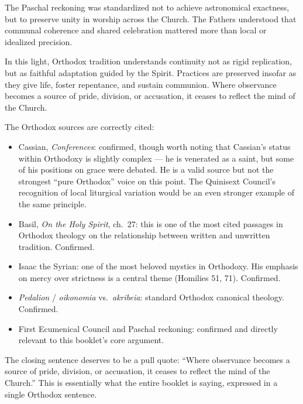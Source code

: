 \documentclass[10pt,twoside,openany]{book}
\begin{document}
The Paschal reckoning was standardized not to achieve astronomical
exactness, but to preserve unity in worship across the Church. The
Fathers understood that communal coherence and shared celebration
mattered more than local or idealized precision.

\bigskip

In this light, Orthodox tradition understands continuity not as rigid
replication, but as faithful adaptation guided by the Spirit. Practices
are preserved insofar as they give life, foster repentance, and sustain
communion. Where observance becomes a source of pride, division, or
accusation, it ceases to reflect the mind of the Church.

\begin{reviewerbox}
The Orthodox sources are correctly cited:

\begin{itemize}[leftmargin=1em,itemsep=2pt]
\item Cassian, \emph{Conferences}: confirmed, though worth noting
   that Cassian's status within Orthodoxy is slightly
   complex --- he is venerated as a saint, but some of
   his positions on grace were debated. He is a valid
   source but not the strongest ``pure Orthodox'' voice
   on this point. The Quinisext Council's recognition
   of local liturgical variation would be an even
   stronger example of the same principle.
\item Basil, \emph{On the Holy Spirit}, ch.\ 27: this is one of
   the most cited passages in Orthodox theology on the
   relationship between written and unwritten tradition.
   Confirmed.
\item Isaac the Syrian: one of the most beloved mystics in
   Orthodoxy. His emphasis on mercy over strictness
   is a central theme (Homilies 51, 71). Confirmed.
\item \emph{Pedalion} / \emph{oikonomia} vs.\ \emph{akribeia}: standard Orthodox
   canonical theology. Confirmed.
\item First Ecumenical Council and Paschal reckoning:
   confirmed and directly relevant to this booklet's
   core argument.
\end{itemize}

The closing sentence deserves to be a pull quote:
``Where observance becomes a source of pride, division,
or accusation, it ceases to reflect the mind of the
Church.'' This is essentially what the entire booklet
is saying, expressed in a single Orthodox sentence.
\end{reviewerbox}
\end{document}
